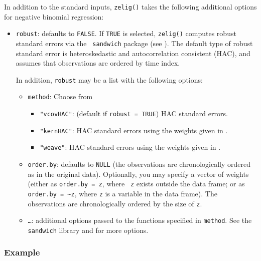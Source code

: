 In addition to the standard inputs, {\tt zelig()} takes the following
additional options for negative binomial regression:  
\begin{itemize}
\item {\tt robust}: defaults to {\tt FALSE}.  If {\tt TRUE} is
selected, {\tt zelig()} computes robust standard errors via the {\tt
sandwich} package (see \cite{Zeileis04}).  The default type of robust
standard error is heteroskedastic and autocorrelation consistent (HAC),
and assumes that observations are ordered by time index.

In addition, {\tt robust} may be a list with the following options:  
\begin{itemize}
\item {\tt method}:  Choose from 
\begin{itemize}
\item {\tt "vcovHAC"}: (default if {\tt robust = TRUE}) HAC standard
errors. 
\item {\tt "kernHAC"}: HAC standard errors using the
weights given in \cite{Andrews91}. 
\item {\tt "weave"}: HAC standard errors using the
weights given in \cite{LumHea99}.  
\end{itemize}  
\item {\tt order.by}: defaults to {\tt NULL} (the observations are
chronologically ordered as in the original data).  Optionally, you may
specify a vector of weights (either as {\tt order.by = z}, where {\tt
z} exists outside the data frame; or as {\tt order.by = \~{}z}, where
{\tt z} is a variable in the data frame).  The observations are
chronologically ordered by the size of {\tt z}.
\item {\tt \dots}:  additional options passed to the functions 
specified in {\tt method}.   See the {\tt sandwich} library and
\cite{Zeileis04} for more options.   
\end{itemize}
\end{itemize}

\subsubsection{Example}

